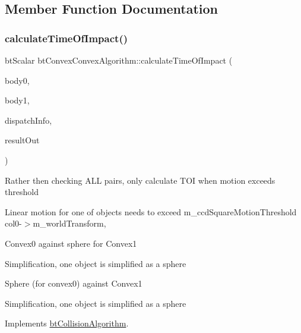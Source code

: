 \subsection{Member Function Documentation}
\mbox{\label{classbtConvexConvexAlgorithm_a55f817b690c4e858d2b02607b382ce6b}} 
\subsubsection{\texorpdfstring{calculate\+Time\+Of\+Impact()}{calculateTimeOfImpact()}}
{\footnotesize\ttfamily bt\+Scalar bt\+Convex\+Convex\+Algorithm\+::calculate\+Time\+Of\+Impact (\begin{DoxyParamCaption}\item[{bt\+Collision\+Object $\ast$}]{body0,  }\item[{bt\+Collision\+Object $\ast$}]{body1,  }\item[{const \hyperlink{structbtDispatcherInfo}{bt\+Dispatcher\+Info} \&}]{dispatch\+Info,  }\item[{\hyperlink{classbtManifoldResult}{bt\+Manifold\+Result} $\ast$}]{result\+Out }\end{DoxyParamCaption})\hspace{0.3cm}{\ttfamily [virtual]}}

Rather then checking A\+LL pairs, only calculate T\+OI when motion exceeds threshold

Linear motion for one of objects needs to exceed m\+\_\+ccd\+Square\+Motion\+Threshold col0-\/$>$m\+\_\+world\+Transform,

Convex0 against sphere for Convex1

Simplification, one object is simplified as a sphere

Sphere (for convex0) against Convex1

Simplification, one object is simplified as a sphere 

Implements \hyperlink{classbtCollisionAlgorithm}{bt\+Collision\+Algorithm}.

\mbox{\label{classbtConvexConvexAlgorithm_aa2a195cdd3b45c169c15ea2de85c4038}} 
